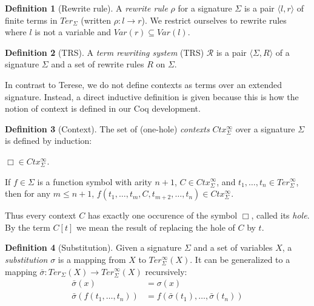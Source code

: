 \documentclass[11pt,oneside,a4paper,final]{report}
\theoremstyle{definition}
\newtheorem{definition}{Definition}
\begin{document}
\begin{definition}[Rewrite rule]
  A \emph{rewrite rule} $\rho$ for a signature $\Sigma$ is a pair $\langle l,
  r \rangle$ of finite terms in $Ter_\Sigma$ (written $\rho : l \rightarrow
  r$). We restrict ourselves to rewrite rules where $l$ is not a variable and
  $Var(r) \subseteq Var(l)$.
\end{definition}

\begin{definition}[TRS]
A \emph{term rewriting system} (TRS) $\mathcal{R}$ is a pair $\langle \Sigma,
R \rangle$ of a signature $\Sigma$ and a set of rewrite rules $R$ on
$\Sigma$.
\end{definition}

In contrast to Terese, we do not define contexts as terms over an extended
signature. Instead, a direct inductive definition is given because this is how
the notion of context is defined in our Coq development.

\begin{definition}[Context]
The set of (one-hole) \emph{contexts} $Ctx_\Sigma^\infty$ over a signature
$\Sigma$ is defined by induction:
\begin{compactenum}
  \item
    $\Box \in Ctx_\Sigma^\infty$.
  \item
    If $f \in \Sigma$ is a function symbol with arity $n + 1$, $C \in
    Ctx_\Sigma^\infty$, and $t_1, \ldots, t_n \in Ter_\Sigma^\infty$, then for
    any $m \leq n + 1$, $f(t_1, \ldots, t_m, C, t_{m+2}, \ldots, t_{n}) \in
    Ctx_\Sigma^\infty$.
\end{compactenum}
\end{definition}

Thus every context $C$ has exactly one occurence of the symbol $\Box$, called
its \emph{hole}. By the term $C[t]$ we mean the result of replacing the hole
of $C$ by $t$.

\begin{definition}[Substitution]
Given a signature $\Sigma$ and a set of variables $X$, a \emph{substitution}
$\sigma$ is a mapping from $X$ to $Ter_\Sigma^\infty(X)$. It can be
generalized to a mapping $\bar{\sigma} : Ter_\Sigma(X) \rightarrow
Ter_\Sigma^\infty(X)$ recursively:
\begin{align*}
  \bar{\sigma}(x) &= \sigma(x)\\
  \bar{\sigma}(f(t_1, \ldots, t_n)) &= f(\bar{\sigma}(t_1), \ldots, \bar{\sigma}(t_n))
\end{align*}
\end{definition}
\end{document}
